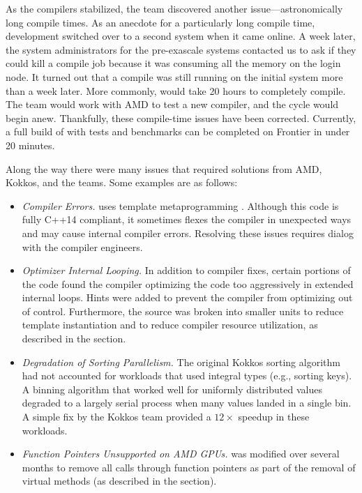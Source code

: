 As the compilers stabilized, the team discovered another issue---astronomically long compile times.
As an anecdote for a particularly long compile time, \vtkm development switched over to a second system when it came online.
A week later, the system administrators for the pre-exascale systems contacted us to ask if they could kill a compile job because it was consuming all the memory on the login node.
It turned out that a \vtkm compile was still running on the initial system more than a week later.
More commonly, \vtkm would take 20 hours to completely compile.
The team would work with AMD to test a new compiler, and the cycle would begin anew.
Thankfully, these compile-time issues have been corrected.
Currently, a full build of \vtkm with tests and benchmarks can be completed on Frontier in under 20 minutes.

Along the way there were many issues that required solutions from AMD, Kokkos, and the \vtkm teams. Some examples are as follows:
\begin{itemize}
\item \emph{Compiler Errors.}
  \vtkm uses template metaprogramming \citep{Meyers2005}.
  Although this code is fully C++14 compliant, it sometimes flexes the compiler in unexpected ways and may cause internal compiler errors.
  Resolving these issues requires dialog with the compiler engineers.
\item \emph{Optimizer Internal Looping.}
  In addition to compiler fixes, certain portions of the code found the compiler optimizing the code too aggressively in extended internal loops.
  Hints were added to prevent the compiler from optimizing out of control.
  Furthermore, the \vtkm source was broken into smaller units to reduce template instantiation and to reduce compiler resource utilization, as described in the  section.
\item \emph{Degradation of Sorting Parallelism.}
  The original Kokkos sorting algorithm had not accounted for \vtkm workloads that used integral types (e.g., sorting keys).
  A binning algorithm that worked well for uniformly distributed values degraded to a largely serial process when many values landed in a single bin.
  A simple fix by the Kokkos team provided a $12\times$ speedup in these workloads.
\item \emph{Function Pointers Unsupported on AMD GPUs.}
  \vtkm was modified over several months to remove all calls through function pointers as part of the removal of virtual methods (as described in the  section).
\end{itemize}

